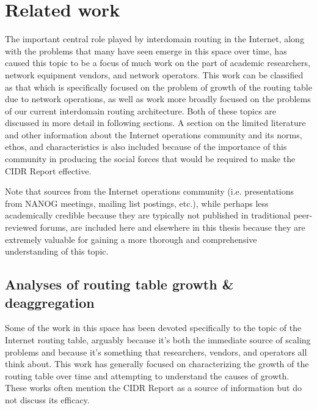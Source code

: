 \chapter{Related work}
\label{chap:relwork}

The important central role played by interdomain routing in the Internet, along
with the problems that many have seen emerge in this space over time, has
caused this topic to be a focus of much work on the part of academic
researchers, network equipment vendors, and network operators. This work can be
classified as that which is specifically focused on the problem of growth of
the routing table due to network operations, as well as work more broadly
focused on the problems of our current interdomain routing architecture. Both
of these topics are discussed in more detail in following sections. A section
on the limited literature and other information about the Internet operations
community and its norms, ethos, and characteristics is also included because of
the importance of this community in producing the social forces that would be
required to make the CIDR Report effective.

Note that sources from the Internet operations community (i.e. presentations
from NANOG meetings, mailing list postings, etc.), while perhaps less
academically credible because they are typically not published in traditional
peer-reviewed forums, are included here and elsewhere in this thesis because
they are extremely valuable for gaining a more thorough and comprehensive
understanding of this topic.


\section{Analyses of routing table growth \& deaggregation}

Some of the work in this space has been devoted specifically to the topic of
the Internet routing table, arguably because it's both the immediate source of
scaling problems and because it's something that researchers, vendors, and
operators all think about. This work has generally focused on characterizing
the growth of the routing table over time and attempting to understand the
causes of growth. These works often mention the CIDR Report as a source of
information but do not discuss its efficacy.

